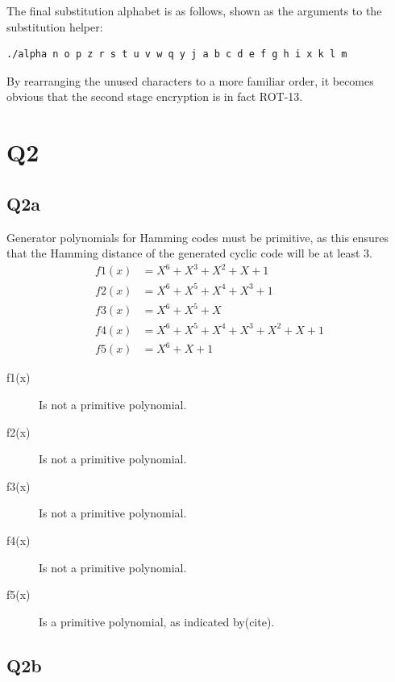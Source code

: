 \documentclass[pdflatex, a4paper,12pt]{article}
\begin{document}
\begin{quote}
    
\end{quote}

The final substitution alphabet is as follows, shown as the arguments to the
substitution helper:

\begin{verbatim}
./alpha n o p z r s t u v w q y j a b c d e f g h i x k l m
\end{verbatim}
By rearranging the unused characters to a more familiar order, it becomes
obvious that the second stage encryption is in fact ROT-13.

\section{Q2}

\subsection{Q2a}

Generator polynomials for Hamming codes must be primitive, as this ensures that
the Hamming distance of the generated cyclic code will be at least 3. 
\begin{align*}
f1(x) & = X^6 + X^3 + X^2 + X + 1\\
f2(x) & = X^6 + X^5 + X^4 + X^3 + 1\\
f3(x) & = X^6 + X^5 + X\\
f4(x) & = X^6 + X^5 + X^4 + X^3 + X^2 + X + 1\\
f5(x) & = X^6 + X + 1
\end{align*}

\begin{description}
    \item[f1(x)] Is not a primitive polynomial. 
    \item[f2(x)] Is not a primitive polynomial.
    \item[f3(x)] Is not a primitive polynomial.
    \item[f4(x)] Is not a primitive polynomial.
    \item[f5(x)] Is a primitive polynomial, as indicated by(cite).
\end{description}

\subsection{Q2b}
\end{document}
